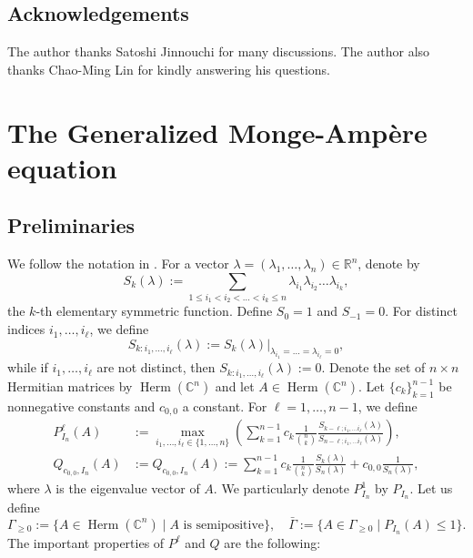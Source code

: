 \documentclass{amsart}
\numberwithin{equation}{section}
\theoremstyle{plain}
\theoremstyle{definition}
\theoremstyle{remark}
\begin{document}
\subsection*{Acknowledgements}
The author thanks Satoshi Jinnouchi for many discussions. The author also thanks Chao-Ming Lin for kindly answering his questions.

\section{The Generalized Monge-Ampère equation}\label{sec:gMA}
\subsection{Preliminaries}\label{subsec:pre}
We follow the notation in \cite{CS17}. For a vector $\lambda=(\lambda_1,\dots,\lambda_n)\in\mathbb{R}^n$, denote by 
\begin{equation*}
    S_k(\lambda):=\sum_{1\le i_1<i_2<\dots<i_k\le n}\lambda_{i_1}\lambda_{i_2}\dots\lambda_{i_k},
\end{equation*}
the $k$-th elementary symmetric function. Define $S_0=1$ and $S_{-1}=0$. For distinct indices $i_1,\dots, i_\ell$, we define
\begin{equation*}
    S_{k:i_1,\dots,i_\ell}(\lambda):=S_k(\lambda)|_{\lambda_{i_1}=\dots=\lambda_{i_\ell}=0},
\end{equation*}
while  if $i_1,\dots, i_\ell$ are not distinct, then $S_{k:i_1,\dots,i_\ell}(\lambda):=0$.
Denote the set of $n\times n$ Hermitian matrices by $\operatorname{Herm}(\mathbb{C}^n)$ and let $A\in\operatorname{Herm}(\mathbb{C}^n)$. Let $\{c_k\}_{k=1}^{n-1}$ be nonnegative constants and $c_{0,0}$ a constant. 
For $\ell=1,\dots,n-1$, we define
\begin{align*}
    P^\ell_{I_n}(A)&:=\max_{i_1,\dots,i_\ell\in\{1,\dots,n\}} \left(\sum_{k=1}^{n-1} c_k\frac{1}{{n\choose k}}\frac{S_{k-\ell;i_1,\dots i_\ell}(\lambda)}{S_{n-\ell;i_1,\dots i_\ell}(\lambda)}\right),\\
    Q_{c_{0,0},I_n}(A)&:=Q_{c_{0,0},I_n}(A) := \sum_{k=1}^{n-1}c_k\frac{1}{{n\choose k}}\frac{S_k(\lambda)}{S_n(\lambda)}+c_{0,0}\frac{1}{S_n(\lambda)},
\end{align*}
where $\lambda$ is the eigenvalue vector of $A$. We particularly denote $P^1_{I_n}$ by $P_{I_n}$.
Let us define 
\begin{equation*}
    \Gamma_{\ge0}:=\{A\in\operatorname{Herm}(\mathbb{C}^n)\mid A \text{ is semipositive}\},\quad \bar{\Gamma}:=\{A\in \Gamma_{\ge0}\mid P_{I_n}(A)\le1 \}.
\end{equation*}
The important properties of $P^\ell$ and $Q$ are the following:
\end{document}
